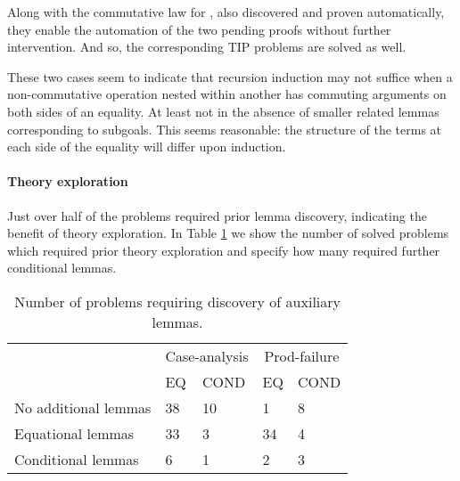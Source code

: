 \noindent Along with the commutative law for , also discovered and proven automatically, they enable the automation of the two pending proofs without further intervention.
%
And so, the corresponding TIP problems are solved as well.

These two cases seem to indicate that recursion induction may not suffice when a non-commutative operation nested within another has commuting arguments on both sides of an equality.
%
At least not in the absence of smaller related lemmas corresponding to subgoals.
%
This seems reasonable: the structure of the terms at each side of the equality will differ upon induction.

%


\paragraph{Theory exploration}

Just over half of the problems required prior lemma discovery, indicating the benefit of theory exploration. In Table \ref{tab:explore} we show the number of solved problems which required prior theory exploration and specify how many required further conditional lemmas.

\begin{table}
\begin{tabularx}{\textwidth}{l | X X | X X}
  & \multicolumn{2}{c|}{Case-analysis} & \multicolumn{2}{c}{Prod-failure} \\
  &  EQ & COND & EQ & COND \\
  \hline
  No additional lemmas & 38 & 10 & 1 & 8 \\
  Equational lemmas & 33 & 3 & 34 & 4 \\
  Conditional lemmas & 6 & 1 & 2 & 3 \\
\end{tabularx}
\caption{Number of problems requiring discovery of auxiliary lemmas.}
\label{tab:explore}
\end{table}

%
%

